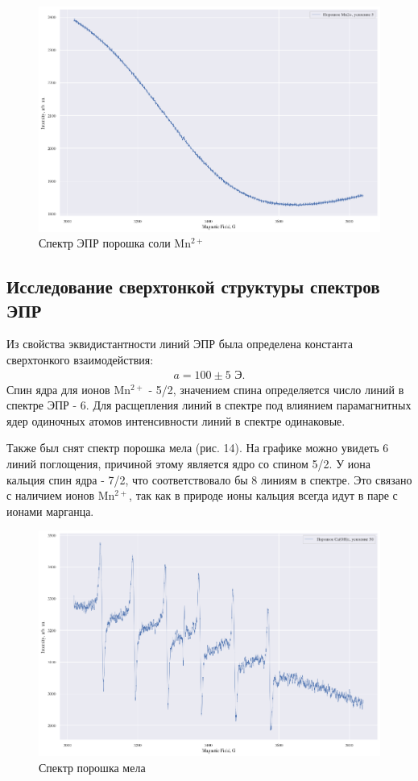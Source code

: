 \documentclass[a4paper,14pt]{article}
\begin{document}
\begin{figure}
	\centering
	\includegraphics{рис13}
	\caption{Спектр ЭПР порошка соли $ \mathrm{Mn^{2+}} $}
	\label{fig:13}
\end{figure}
\subsection{Исследование сверхтонкой структуры спектров ЭПР}
Из свойства эквидистантности линий ЭПР была определена константа сверхтонкого взаимодействия:
\begin{gather*}
	a=100\pm 5 \text{ Э.}
\end{gather*}
Спин ядра для ионов $ \mathrm{Mn^{2+}} $ - 5/2, значением спина определяется число линий в спектре ЭПР - 6. Для расщепления линий в спектре под влиянием парамагнитных ядер одиночных атомов интенсивности линий в спектре одинаковые. 
\par
Также был снят спектр порошка мела (рис. 14). На графике можно увидеть 6 линий поглощения, причиной этому является ядро со спином 5/2. У иона кальция спин ядра - 7/2, что соответствовало бы 8 линиям в спектре. Это связано с наличием ионов $ \mathrm{Mn^{2+}} $, так как в природе ионы кальция всегда идут в паре с ионами марганца.
\begin{figure}[h]
	\centering
	\includegraphics{рис14}
	\caption{Спектр порошка мела}
	\label{fig:14}
\end{figure}
\end{document}

